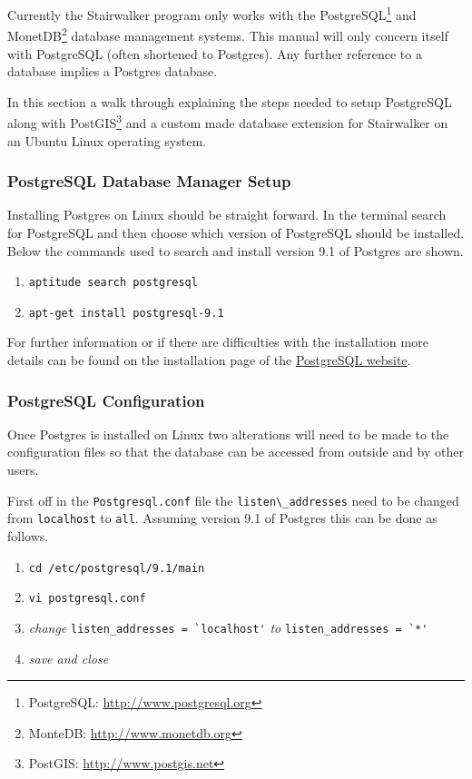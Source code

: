 Currently the Stairwalker program only works with the PostgreSQL\footnote{PostgreSQL: \url{http://www.postgresql.org}} and MonetDB\footnote{MonteDB: \url{http://www.monetdb.org}} database management systems. This manual will only concern itself with PostgreSQL (often shortened to Postgres). Any further reference to a database implies a Postgres database.

In this section a walk through explaining the steps needed to setup PostgreSQL along with PostGIS\footnote{PostGIS: \url{http://www.postgis.net}} and a custom made database extension for Stairwalker on an Ubuntu Linux operating system.

\subsubsection{PostgreSQL Database Manager Setup}
\label{sec:postgresql}
Installing Postgres on Linux should be straight forward. In the terminal search for PostgreSQL and then choose which version of PostgreSQL should be installed. Below the commands used to search and install version 9.1 of Postgres are shown.

\begin{enumerate}
	\item \lstinline|aptitude search postgresql|
	\item \lstinline|apt-get install postgresql-9.1|
\end{enumerate}
For further information or if there are difficulties with the installation more details can be found on the installation page of the \href{http://www.postgresql.org/download/}{PostgreSQL website}.  

\subsubsection{PostgreSQL Configuration}
Once Postgres is installed on Linux two alterations will need to be made to the configuration files so that the database can be accessed from outside and by other users.

First off in the \lstinline|Postgresql.conf| file the \lstinline|listen\_addresses| need to be changed from \lstinline|localhost| to \lstinline|all|. Assuming version 9.1 of Postgres this can be done as follows.

\begin{enumerate}
	\item \lstinline|cd /etc/postgresql/9.1/main|
	\item \lstinline|vi postgresql.conf|
	\item \textit{change} \lstinline|listen_addresses = `localhost'| \textit{to} \lstinline|listen_addresses = `*'|
	\item \textit{save and close}
\end{enumerate}

